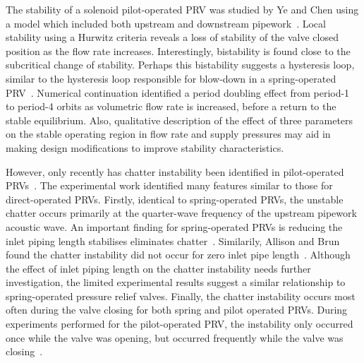 The stability of a solenoid pilot-operated PRV was studied by Ye and Chen using a model which included both upstream and downstream pipework~\cite{Ye2009DynamicSystem}.
Local stability using a Hurwitz criteria reveals a loss of stability of the valve closed position as the flow rate increases. Interestingly, bistability is found close to the subcritical change of stability. Perhaps this bistability suggests a hysteresis loop, similar to the hysteresis loop responsible for blow-down in a spring-operated PRV~\cite{ErdodiTheEstimation}. Numerical continuation identified a period doubling effect from period-1 to period-4 orbits as volumetric flow rate is increased, before a return to the stable equilibrium. Also, qualitative description of the effect of three parameters on the stable operating region in flow rate and supply pressures may aid in making design modifications to improve stability characteristics.

%
However, only recently has chatter instability been identified in pilot-operated PRVs~\cite{Allison2015TestingValves}. The experimental work identified many features similar to those for direct-operated PRVs. Firstly, identical to spring-operated PRVs, the unstable chatter occurs primarily at the quarter-wave frequency of the upstream pipework acoustic wave.
%
An important finding for spring-operated PRVs is reducing the inlet piping length stabilises eliminates chatter~\cite{Hos2014DynamicMechanisms}. Similarily, Allison and Brun found the chatter instability did not occur for zero inlet pipe length~\cite{Allison2015TestingValves}. Although the effect of inlet piping length on the chatter instability needs further investigation, the limited experimental results suggest a similar relationship to spring-operated pressure relief valves.
%
Finally, the chatter instability occurs most often during the valve closing for both spring and pilot operated PRVs. During experiments performed for the pilot-operated PRV, the instability only occurred once while the valve was opening, but occurred frequently while the valve was closing~\cite{Allison2015TestingValves}.








